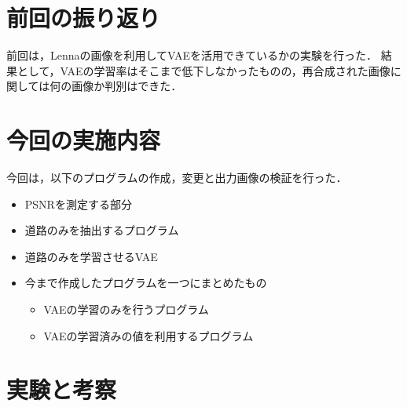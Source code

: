 \documentclass[twocolumn, a4j]{jsarticle}
\begin{document}

\section{前回の振り返り}
前回は，Lennaの画像を利用してVAEを活用できているかの実験を行った．
結果として，VAEの学習率はそこまで低下しなかったものの，再合成された画像に関しては何の画像か判別はできた．

\section{今回の実施内容}
今回は，以下のプログラムの作成，変更と出力画像の検証を行った．
\begin{itemize}
  \item PSNRを測定する部分
  \item 道路のみを抽出するプログラム
  \item 道路のみを学習させるVAE
  \item 今まで作成したプログラムを一つにまとめたもの
  \begin{itemize}
    \item VAEの学習のみを行うプログラム
    \item VAEの学習済みの値を利用するプログラム
  \end{itemize}
\end{itemize}

\section{実験と考察}
\end{document}
